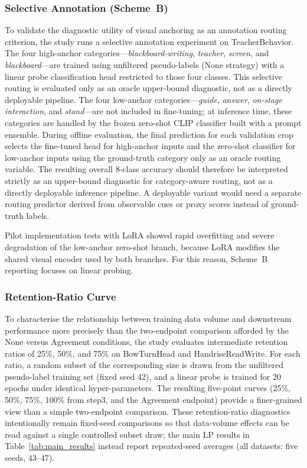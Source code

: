 \documentclass{ieeeaccess}
\begin{document}
\subsubsection{Selective Annotation (Scheme~B)}

To validate the diagnostic utility of visual anchoring as an annotation
routing criterion, the study runs a selective annotation experiment on
TeacherBehavior.
The four high-anchor categories---\textit{blackboard-writing},
\textit{teacher}, \textit{screen}, and \textit{blackboard}---are
trained using unfiltered pseudo-labels (None strategy) with a linear
probe classification head restricted to those four classes.
This selective routing is evaluated only as an oracle upper-bound
diagnostic, not as a directly deployable pipeline.
The four low-anchor categories---\textit{guide}, \textit{answer},
\textit{on-stage interaction}, and \textit{stand}---are not included
in fine-tuning; at inference time, these categories are handled by the
frozen zero-shot CLIP classifier built with a prompt ensemble.
During offline evaluation, the final prediction for each validation
crop selects the fine-tuned head for high-anchor inputs and the
zero-shot classifier for low-anchor inputs using the ground-truth
category only as an oracle routing variable.
The resulting overall 8-class accuracy should therefore be interpreted
strictly as an upper-bound diagnostic for category-aware routing, not
as a directly deployable inference pipeline.
A deployable variant would need a separate routing predictor derived
from observable cues or proxy scores instead of ground-truth labels.

Pilot implementation tests with LoRA showed rapid overfitting and
severe degradation of the low-anchor zero-shot branch, because LoRA
modifies the shared visual encoder used by both branches.
For this reason, Scheme~B reporting focuses on linear probing.

\subsubsection{Retention-Ratio Curve}

To characterise the relationship between training data volume and
downstream performance more precisely than the two-endpoint comparison
afforded by the None versus Agreement conditions, the study evaluates
intermediate retention ratios of 25\%, 50\%, and 75\% on BowTurnHead
and HandriseReadWrite.
For each ratio, a random subset of the corresponding size is drawn
from the unfiltered pseudo-label training set (fixed seed 42), and
a linear probe is trained for 20 epochs under identical hyper-parameters.
The resulting five-point curves (25\%, 50\%, 75\%, 100\% from step3,
and the Agreement endpoint) provide a finer-grained view than a simple
two-endpoint comparison. These retention-ratio diagnostics intentionally
remain fixed-seed comparisons so that data-volume effects can be read
against a single controlled subset draw; the main LP results in
Table~\ref{tab:main_results} instead report repeated-seed averages
(all datasets: five seeds, 43--47).
\end{document}
